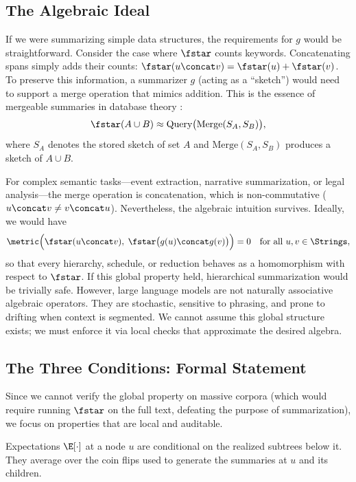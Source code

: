 \subsection{The Algebraic Ideal}

If we were summarizing simple data structures, the requirements for $g$ would be straightforward. Consider the case where $\fstar$ counts keywords. Concatenating spans simply adds their counts: $\fstar(u \concat v) = \fstar(u) + \fstar(v)$. To preserve this information, a summarizer $g$ (acting as a ``sketch'') would need to support a merge operation that mimics addition. This is the essence of mergeable summaries in database theory \citep{Agarwal2013MergeableTODS}:
\[
\fstar(A \cup B) \approx \text{Query}\big(\text{Merge}(S_A, S_B)\big),
\]
where $S_A$ denotes the stored sketch of set $A$ and $\text{Merge}(S_A, S_B)$ produces a sketch of $A \cup B$.

For complex semantic tasks---event extraction, narrative summarization, or legal analysis---the merge operation is concatenation, which is non-commutative ($u \concat v \neq v \concat u$). Nevertheless, the algebraic intuition survives. Ideally, we would have
\[
\metric\Big(\fstar(u \concat v), \;\fstar\big(g(u) \concat g(v)\big)\Big) = 0 \quad \text{for all } u, v \in \Strings,
\]
so that every hierarchy, schedule, or reduction behaves as a homomorphism with respect to $\fstar$. If this global property held, hierarchical summarization would be trivially safe. However, large language models are not naturally associative algebraic operators. They are stochastic, sensitive to phrasing, and prone to drifting when context is segmented. We cannot assume this global structure exists; we must enforce it via local checks that approximate the desired algebra.

\subsection{The Three Conditions: Formal Statement}

Since we cannot verify the global property on massive corpora (which would require running $\fstar$ on the full text, defeating the purpose of summarization), we focus on properties that are local and auditable.

\begin{convention}
Expectations $\E[\cdot]$ at a node $u$ are conditional on the realized subtrees below it. They average over the coin flips used to generate the summaries at $u$ and its children.
\end{convention}

